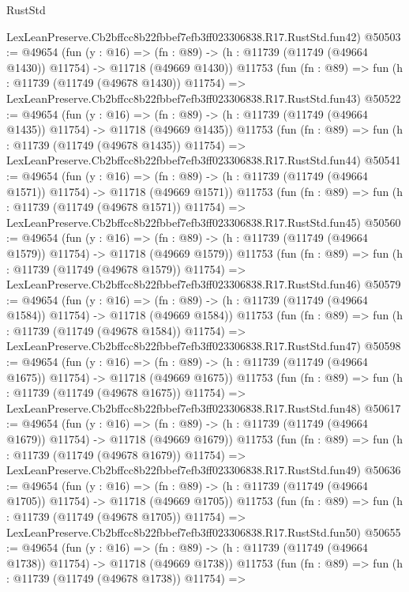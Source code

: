 \begin{lexlean}{RustStd}
\begin{coremodule}
    LexLeanPreserve.Cb2bffcc8b22fbbef7efb3ff023306838.R17.RustStd.fun42)
@50503 := @49654
    (fun (y : @16) =>
    (fn : @89) -> (h : @11739 (@11749 (@49664 @1430)) @11754) -> @11718 (@49669 @1430))
    @11753
    (fun (fn : @89) =>
    fun (h : @11739 (@11749 (@49678 @1430)) @11754) =>
    LexLeanPreserve.Cb2bffcc8b22fbbef7efb3ff023306838.R17.RustStd.fun43)
@50522 := @49654
    (fun (y : @16) =>
    (fn : @89) -> (h : @11739 (@11749 (@49664 @1435)) @11754) -> @11718 (@49669 @1435))
    @11753
    (fun (fn : @89) =>
    fun (h : @11739 (@11749 (@49678 @1435)) @11754) =>
    LexLeanPreserve.Cb2bffcc8b22fbbef7efb3ff023306838.R17.RustStd.fun44)
@50541 := @49654
    (fun (y : @16) =>
    (fn : @89) -> (h : @11739 (@11749 (@49664 @1571)) @11754) -> @11718 (@49669 @1571))
    @11753
    (fun (fn : @89) =>
    fun (h : @11739 (@11749 (@49678 @1571)) @11754) =>
    LexLeanPreserve.Cb2bffcc8b22fbbef7efb3ff023306838.R17.RustStd.fun45)
@50560 := @49654
    (fun (y : @16) =>
    (fn : @89) -> (h : @11739 (@11749 (@49664 @1579)) @11754) -> @11718 (@49669 @1579))
    @11753
    (fun (fn : @89) =>
    fun (h : @11739 (@11749 (@49678 @1579)) @11754) =>
    LexLeanPreserve.Cb2bffcc8b22fbbef7efb3ff023306838.R17.RustStd.fun46)
@50579 := @49654
    (fun (y : @16) =>
    (fn : @89) -> (h : @11739 (@11749 (@49664 @1584)) @11754) -> @11718 (@49669 @1584))
    @11753
    (fun (fn : @89) =>
    fun (h : @11739 (@11749 (@49678 @1584)) @11754) =>
    LexLeanPreserve.Cb2bffcc8b22fbbef7efb3ff023306838.R17.RustStd.fun47)
@50598 := @49654
    (fun (y : @16) =>
    (fn : @89) -> (h : @11739 (@11749 (@49664 @1675)) @11754) -> @11718 (@49669 @1675))
    @11753
    (fun (fn : @89) =>
    fun (h : @11739 (@11749 (@49678 @1675)) @11754) =>
    LexLeanPreserve.Cb2bffcc8b22fbbef7efb3ff023306838.R17.RustStd.fun48)
@50617 := @49654
    (fun (y : @16) =>
    (fn : @89) -> (h : @11739 (@11749 (@49664 @1679)) @11754) -> @11718 (@49669 @1679))
    @11753
    (fun (fn : @89) =>
    fun (h : @11739 (@11749 (@49678 @1679)) @11754) =>
    LexLeanPreserve.Cb2bffcc8b22fbbef7efb3ff023306838.R17.RustStd.fun49)
@50636 := @49654
    (fun (y : @16) =>
    (fn : @89) -> (h : @11739 (@11749 (@49664 @1705)) @11754) -> @11718 (@49669 @1705))
    @11753
    (fun (fn : @89) =>
    fun (h : @11739 (@11749 (@49678 @1705)) @11754) =>
    LexLeanPreserve.Cb2bffcc8b22fbbef7efb3ff023306838.R17.RustStd.fun50)
@50655 := @49654
    (fun (y : @16) =>
    (fn : @89) -> (h : @11739 (@11749 (@49664 @1738)) @11754) -> @11718 (@49669 @1738))
    @11753
    (fun (fn : @89) =>
    fun (h : @11739 (@11749 (@49678 @1738)) @11754) =>

\end{coremodule}
\end{lexlean}
